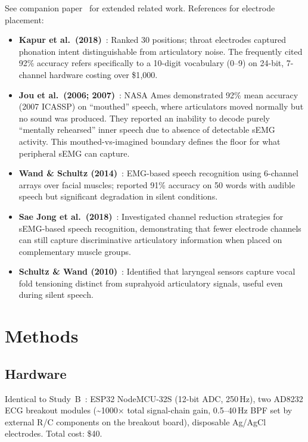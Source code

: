 \documentclass{article}
\begin{document}
See companion paper~\cite{kho2026companion} for extended related work. References for electrode placement:
\begin{itemize}
    \item \textbf{Kapur et al.\ (2018)}~\cite{kapur2018}: Ranked 30 positions; throat electrodes captured phonation intent distinguishable from articulatory noise. The frequently cited 92\% accuracy refers specifically to a 10-digit vocabulary (0--9) on 24-bit, 7-channel hardware costing over \$1{,}000.
    \item \textbf{Jou et al.\ (2006; 2007)}~\cite{jou2006,jou2007}: NASA Ames demonstrated 92\% mean accuracy (2007 ICASSP) on ``mouthed'' speech, where articulators moved normally but no sound was produced. They reported an inability to decode purely ``mentally rehearsed'' inner speech due to absence of detectable sEMG activity. This mouthed-vs-imagined boundary defines the floor for what peripheral sEMG can capture.
    \item \textbf{Wand \& Schultz (2014)}~\cite{wand2014}: EMG-based speech recognition using 6-channel arrays over facial muscles; reported 91\% accuracy on 50 words with audible speech but significant degradation in silent conditions.
    \item \textbf{Sae Jong et al.\ (2018)}~\cite{saejong2018}: Investigated channel reduction strategies for sEMG-based speech recognition, demonstrating that fewer electrode channels can still capture discriminative articulatory information when placed on complementary muscle groups.
    \item \textbf{Schultz \& Wand (2010)}~\cite{schultz2010}: Identified that laryngeal sensors capture vocal fold tensioning distinct from suprahyoid articulatory signals, useful even during silent speech.
\end{itemize}

\section{Methods}

\subsection{Hardware}

Identical to Study~B~\cite[{\S}2.1]{kho2026companion}: ESP32 NodeMCU-32S (12-bit ADC, 250\,Hz), two AD8232 ECG breakout modules (\textasciitilde1000$\times$ total signal-chain gain, 0.5--40\,Hz BPF set by external R/C components on the breakout board), disposable Ag/AgCl electrodes. Total cost: \$40.
\end{document}
